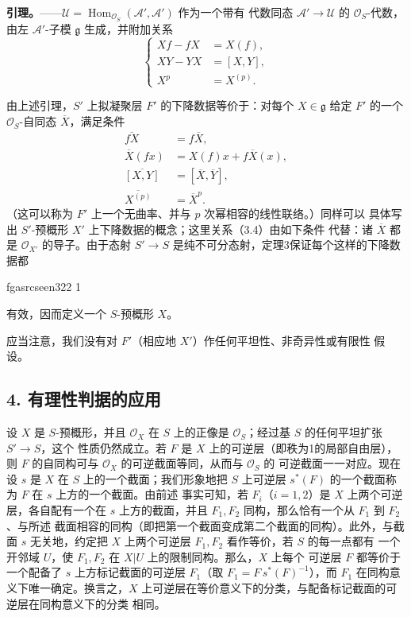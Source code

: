 \documentclass[12pt,twoside,openany]{book}
\numberwithin{equation}{section}
\newcommand{\fgaunitid}{unbound}
\newcommand{\src}[1]{%
  \phantomsection
  \hypertarget{src:\fgaunitid:#1}{}%
  \hypertarget{fga.\fgaunitid.p#1}{}%
  \ifcsname fgasrcseen#1\endcsname\else
    \expandafter\gdef\csname fgasrcseen#1\endcsname{1}%
    \hypertarget{src:#1}{}%
  \fi
  \marginpar{\raggedleft\footnotesize\sffamily #1}%
}
\theoremstyle{plain}
\theoremstyle{definition}
\theoremstyle{remark}
\begin{document}
\textbf{引理。}——$\mathcal U=
\operatorname{Hom}_{\mathcal O_S}(\mathcal A',\mathcal A')$ 作为一个带有
代数同态 $\mathcal A'\longrightarrow\mathcal U$ 的 $\mathcal O_S$-代数，
由左 $\mathcal A'$-子模 $\mathfrak g$ 生成，并附加关系
\begin{equation}
  \left\{
  \begin{aligned}
    Xf-fX&=X(f),\\
    XY-YX&=[X,Y],\\
    X^p&=X^{(p)}.
  \end{aligned}
  \right.
  \tag{3.6}
\end{equation}

由上述引理，$S'$ 上拟凝聚层 $F'$ 的下降数据等价于：对每个
$X\in\mathfrak g$ 给定 $F'$ 的一个 $\mathcal O_S$-自同态
$\overline X$，满足条件
\begin{align}
  \overline{fX}&=f\overline X, \tag{3.7}\\
  \overline X(fx)&=X(f)x+f\overline X(x), \tag{3.8}\\
  \overline{[X,Y]}&=[\overline X,\overline Y], \tag{3.9}\\
  \overline{X^{(p)}}&=\overline X^p. \tag{3.10}
\end{align}
（这可以称为 $F'$ 上一个无曲率、并与 $p$ 次幂相容的线性联络。）同样可以
具体写出 $S'$-预概形 $X'$ 上下降数据的概念；这里关系（3.4）由如下条件
代替：诸 $\overline X$ 都是 $\mathcal O_{X'}$ 的导子。由于态射
$S'\longrightarrow S$ 是纯不可分态射，定理3保证每个这样的下降数据都

\src{322}
有效，因而定义一个 $S$-预概形 $X$。

应当注意，我们没有对 $F'$（相应地 $X'$）作任何平坦性、非奇异性或有限性
假设。

\subsection*{4. 有理性判据的应用}

设 $X$ 是 $S$-预概形，并且 $\mathcal O_X$ 在 $S$ 上的正像是
$\mathcal O_S$；经过基 $S$ 的任何平坦扩张 $S'\longrightarrow S$，这个
性质仍然成立。若 $F$ 是 $X$ 上的可逆层（即秩为1的局部自由层），则 $F$
的自同构可与 $\mathcal O_X$ 的可逆截面等同，从而与 $\mathcal O_S$ 的
可逆截面一一对应。现在设 $s$ 是 $X$ 在 $S$ 上的一个截面；我们形象地把
$S$ 上可逆层 $s^*(F)$ 的一个截面称为 $F$ 在 $s$ 上方的一个截面。由前述
事实可知，若 $F_i$（$i=1,2$）是 $X$ 上两个可逆层，各自配有一个在 $s$
上方的截面，并且 $F_1,F_2$ 同构，那么恰有一个从 $F_1$ 到 $F_2$、与所述
截面相容的同构（即把第一个截面变成第二个截面的同构）。此外，与截面 $s$
无关地，约定把 $X$ 上两个可逆层 $F_1,F_2$ 看作等价，若 $S$ 的每一点都有
一个开邻域 $U$，使 $F_1,F_2$ 在 $X|U$ 上的限制同构。那么，$X$ 上每个
可逆层 $F$ 都等价于一个配备了 $s$ 上方标记截面的可逆层 $F_1$（取
$F_1=F\,s^*(F)^{-1}$），而 $F_1$ 在同构意义下唯一确定。换言之，$X$
上可逆层在等价意义下的分类，与配备标记截面的可逆层在同构意义下的分类
相同。
\end{document}
